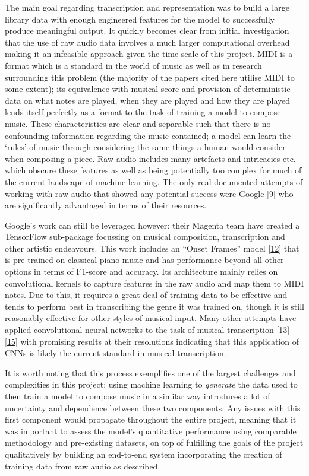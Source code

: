 \documentclass[12pt,]{article}
\begin{document}
The main goal regarding transcription and representation was to build a
large library data with enough engineered features for the model to
successfully produce meaningful output. It quickly becomes clear from
initial investigation that the use of raw audio data involves a much
larger computational overhead making it an infeasible approach given the
time-scale of this project. MIDI is a format which is a standard in the
world of music as well as in research surrounding this problem (the
majority of the papers cited here utilise MIDI to some extent); its
equivalence with musical score and provision of deterministic data on
what notes are played, when they are played and how they are played
lends itself perfectly as a format to the task of training a model to
compose music. These characteristics are clear and separable such that
there is no confounding information regarding the music contained; a
model can learn the `rules' of music through considering the same things
a human would consider when composing a piece. Raw audio includes many
artefacts and intricacies etc. which obscure these features as well as
being potentially too complex for much of the current landscape of
machine learning. The only real documented attempts of working with raw
audio that showed any potential success were Google
{[}\protect\hyperlink{ref-oord2016wavenet}{9}{]} who are significantly
advantaged in terms of their resources.

Google's work can still be leveraged however: their Magenta team have
created a TensorFlow sub-package focussing on musical composition,
transcription and other artistic endeavours. This work includes an
``Onset Frames'' model
{[}\protect\hyperlink{ref-hawthorne2017onsets}{12}{]} that is
pre-trained on classical piano music and has performance beyond all
other options in terms of F1-score and accuracy. Its architecture mainly
relies on convolutional kernels to capture features in the raw audio and
map them to MIDI notes. Due to this, it requires a great deal of
training data to be effective and tends to perform best in transcribing
the genre it was trained on, though it is still reasonably effective for
other styles of musical input. Many other attempts have applied
convolutional neural networks to the task of musical transcription
{[}\protect\hyperlink{ref-bereketai}{13}{]}--{[}\protect\hyperlink{ref-sarnatskyi2017music}{15}{]}
with promising results at their resolutions indicating that this
application of CNNs is likely the current standard in musical
transcription.

It is worth noting that this process exemplifies one of the largest
challenges and complexities in this project: using machine learning to
\emph{generate} the data used to then train a model to compose music in
a similar way introduces a lot of uncertainty and dependence between
these two components. Any issues with this first component would
propagate throughout the entire project, meaning that it was important
to assess the model's quantitative performance using comparable
methodology and pre-existing datasets, on top of fulfilling the goals of
the project qualitatively by building an end-to-end system incorporating
the creation of training data from raw audio as described.
\end{document}
